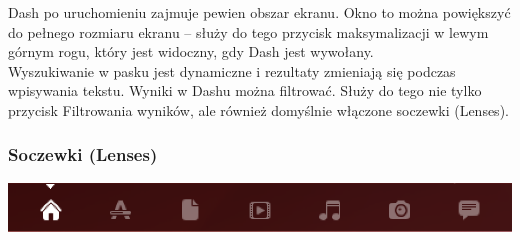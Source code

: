 Dash po uruchomieniu zajmuje pewien obszar ekranu. Okno to można powiększyć do pełnego rozmiaru ekranu – służy do tego przycisk maksymalizacji w lewym górnym rogu, który jest widoczny, gdy Dash jest wywołany.\\
Wyszukiwanie w pasku jest dynamiczne i rezultaty zmieniają się podczas wpisywania tekstu. Wyniki w Dashu można filtrować. Służy do tego nie tylko przycisk Filtrowania wyników, ale również domyślnie włączone soczewki (Lenses).
\clearpage

\subsubsection{Soczewki (Lenses)}
\begin{center}
	\includegraphics[scale=0.5]{images/unity_dash_lenses.png}
\end{center}

